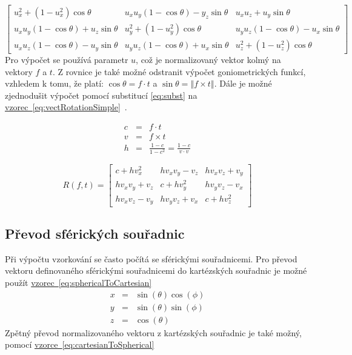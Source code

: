 \documentclass[czech,master]{diploma}
\newcommand{\fromVect}{f}
\newcommand{\toVect}{t}
\begin{document}
\begin{equation} \label{eq:vectRotation}
  \begin{bmatrix}
    u_x^2 + \left ( 1 - u_x^2\right ) \cos\theta                & u_x u_y \left ( 1 - \cos \theta \right ) - y_z \sin \theta & u_x u_z + u_y \sin \theta                                  \\
    u_x u_y \left ( 1 -  \cos \theta \right ) + u_z \sin \theta & u_y^2 + \left ( 1 - u_y^2\right ) \cos\theta               & u_y u_z \left ( 1 - \cos \theta \right ) - u_x \sin \theta \\
    u_x u_z \left ( 1 - \cos \theta \right ) - u_y \sin \theta  & u_y u_z \left ( 1 - \cos \theta \right ) + u_x \sin \theta & u_z^2 + \left ( 1 - u_z^2\right ) \cos\theta
  \end{bmatrix}
\end{equation}
Pro výpočet se používá parametr \(u\), což je normalizovaný vektor kolmý na vektory \(\fromVect\) a \(\toVect\). Z rovnice je také možné odstranit výpočet goniometrických funkcí, vzhledem k tomu, že platí: \(\cos \theta = \fromVect \cdot \toVect\) a \(\sin \theta = \left\Vert \fromVect \times \toVect \right\Vert\). Dále je možné zjednodušit výpočet pomocí substitucí \hyperref[eq:subst]{\ref{eq:subst}} na \hyperref[eq:vectRotationSimple]{vzorec~\ref{eq:vectRotationSimple}}~\cite{MollerHughesVectRotation}.

\begin{eqnarray} \label{eq:subst}
  c &=& \fromVect \cdot \toVect \nonumber\\
  v &=& \fromVect \times \toVect \nonumber\\
  h &=& \frac{1 - c}{1 - c^2} = \frac{1 - c}{v \cdot v} \nonumber
\end{eqnarray}

\begin{equation} \label{eq:vectRotationSimple}
  R\left ( \fromVect, \toVect \right) = \begin{bmatrix}
    c + h v_x^2     & h v_x v_y - v_z & h v_x v_z + v_y \\
    h v_x v_y + v_z & c + h v_y^2     & h v_y v_z - v_x \\
    h v_x v_z - v_y & h v_y v_z + v_x & c + h v_z^2
  \end{bmatrix}
\end{equation}

\subsection{Převod sférických souřadnic}
Při výpočtu vzorkování se často počítá se sférickými souřadnicemi. Pro převod vektoru definovaného sférickými souřadnicemi do kartézských souřadnic je možné použít \hyperref[eq:sphericalToCartesian]{vzorec~\ref{eq:sphericalToCartesian}}
\begin{eqnarray}
  x & = & \sin(\theta)\cos(\phi)\nonumber \\
  y & = & \sin(\theta)\sin(\phi)\nonumber \\
  z & = & \cos(\theta)\label{eq:sphericalToCartesian}
\end{eqnarray}
Zpětný převod normalizovaného vektoru z kartézských souřadnic je také možný, pomocí \hyperref[eq:cartesianToSpherical]{vzorce~\ref{eq:cartesianToSpherical}}
\end{document}
